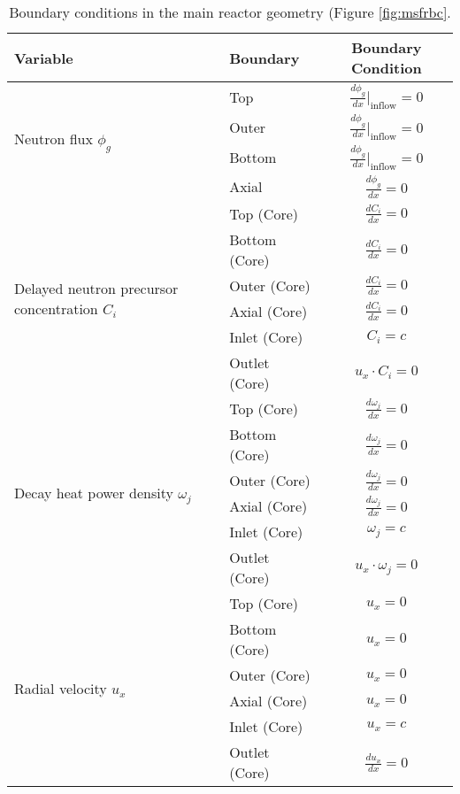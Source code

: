 \begin{table}[htbp!]
    \small
	\caption{Boundary conditions in the main reactor geometry (Figure
	\ref{fig:msfrbc}.}
	\centering
	\begin{tabular}{ l l c}
		\toprule
		Variable & Boundary & Boundary Condition \\
		\midrule
		\multirow{4}{*}{Neutron flux $\phi_g$} & Top & $\frac{d \phi_g}{dx}
		\big|_{\text{inflow}} = 0$ \\
        & Outer & $\frac{d \phi_g}{dx} \big|_{\text{inflow}} = 0$ \\
        & Bottom & $\frac{d \phi_g}{dx} \big|_{\text{inflow}} = 0$ \\
        & Axial & $\frac{d \phi_g}{dx} = 0$ \\
        \midrule
        \multirow{6}{*}{Delayed neutron precursor concentration $C_i$} &
        Top (Core) & $\frac{d C_i}{dx} = 0$ \\
        & Bottom (Core) & $\frac{d C_i}{dx} = 0$ \\
        & Outer (Core) & $\frac{d C_i}{dx} = 0$ \\
        & Axial (Core) & $\frac{d C_i}{dx} = 0$ \\
        & Inlet (Core) & $C_i = c$ \\
        & Outlet (Core) & $u_x \cdot C_i = 0$ \\
        \midrule
        \multirow{6}{*}{Decay heat power density $\omega_j$} &
        Top (Core) & $\frac{d \omega_j}{dx} = 0$ \\
        & Bottom (Core) & $\frac{d \omega_j}{dx} = 0$ \\
        & Outer (Core) & $\frac{d \omega_j}{dx} = 0$ \\
        & Axial (Core) & $\frac{d \omega_j}{dx} = 0$ \\
        & Inlet (Core) & $\omega_j = c$ \\
        & Outlet (Core) & $u_x \cdot \omega_j = 0$ \\
        \midrule
        \multirow{6}{*}{Radial velocity $u_x$} & Top (Core) & $u_x = 0$ \\
        & Bottom (Core) & $u_x = 0$ \\
        & Outer (Core) & $u_x = 0$ \\
        & Axial (Core) & $u_x = 0$ \\
        & Inlet (Core) & $u_x = c$ \\
        & Outlet (Core) & $\frac{d u_x}{dx} = 0$ \\
        \midrule

\end{tabular}
\end{table}
